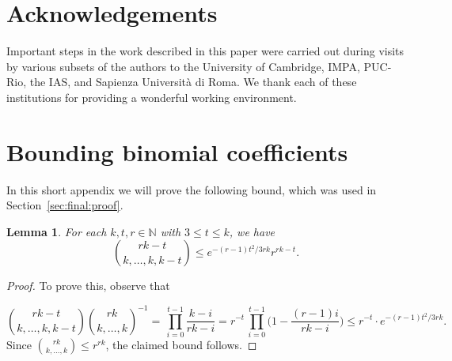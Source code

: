 \documentclass[12pt,reqno]{amsart}
\newtheorem{lemma}[theorem]{Lemma}
\theoremstyle{definition}
\theoremstyle{remark}
\newcommand\N{\mathbb{N}}
\renewcommand{\le}{\leqslant}
\def\N{\mathbb{N}}
\begin{document}
\section*{Acknowledgements}

Important steps in the work described in this paper were carried out during visits by various subsets of the authors to the University of Cambridge, IMPA, PUC-Rio, the IAS,
and Sapienza Università di Roma. We thank each of these institutions for providing a wonderful working environment.

\appendix

\section{Bounding binomial coefficients}\label{app:binomial}

In this short appendix we will prove the following bound, which was used in Section~\ref{sec:final:proof}.

%
\begin{lemma}
	\label{lem:multibounds}
	For each \(k,t,r \in \N\) with \(3 \le t \le k\), we have
	\begin{equation*}
		\binom{rk-t}{k,\dots,k,k-t} \le e^{-(r-1)t^2/3rk} r^{rk-t}.
	\end{equation*}
%
\end{lemma}
%
\begin{proof}
	To prove this, observe that

	\begin{equation*}
		\binom{rk-t}{k,\dots,k,k-t} \binom{rk}{k,\dots,k}^{-1} = \, \prod_{i = 0}^{t - 1} \frac{k - i}{rk - i} = r^{-t} \,\prod_{i = 0}^{t-1} \bigg( 1 - \frac{(r-1)i}{rk - i} \bigg) \le r^{-t} \cdot e^{-(r-1)t^2/3rk}.
	\end{equation*}
	Since \(\binom{rk}{k,\dots,k} \le r^{rk}\), the claimed bound follows.
\end{proof}
%
\end{document}
